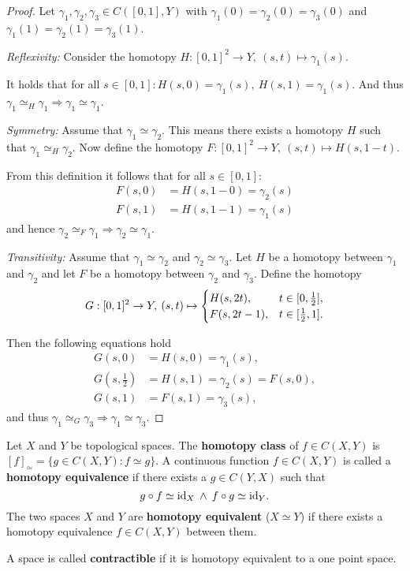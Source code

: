 \begin{proof}
  Let $\gamma_1, \gamma_2, \gamma_3 \in C([0,1],Y)$ with $\gamma_1(0) = \gamma_2(0) = \gamma_3(0)$ and $\gamma_1(1) = \gamma_2(1) = \gamma_3(1)$.
  
  \textit{Reflexivity:}
  Consider the homotopy $H\colon [0,1]^2 \to Y, \: (s, t) \mapsto \gamma_1(s)$. 
  
  It holds that for all $s\in [0,1]\colon H(s, 0) = \gamma_1(s),\: H(s, 1) = \gamma_1(s)$. And thus $\gamma_1 \simeq_H \gamma_1 \Rightarrow \gamma_1 \simeq \gamma_1$.

  \textit{Symmetry:} 
  Assume that $\gamma_1 \simeq \gamma_2$. This means there exists a homotopy $H$ such that $\gamma_1 \simeq_H \gamma_2$. 
  Now define the homotopy $F\colon [0,1]^2 \to Y, \: (s, t) \mapsto H(s, 1-t)$. 
  
  From this definition it follows that for all $s \in [0,1]:$
  \begin{align*}
    F(s, 0) &= H(s, 1 - 0) = \gamma_2(s) \\
    F(s, 1) &= H(s, 1 - 1) = \gamma_1(s)
  \end{align*}
  and hence $\gamma_2 \simeq_F \gamma_1 \Rightarrow \gamma_2 \simeq \gamma_1$.

  \textit{Transitivity:}
  Assume that $\gamma_1 \simeq \gamma_2$ and $\gamma_2 \simeq \gamma_3$. Let $H$ be a homotopy between $\gamma_1$ and $\gamma_2$ and let $F$ be a homotopy between $\gamma_2$ and $\gamma_3$. 
  Define the homotopy
  \begin{equation*} 
    G: [0,1]^2 \to Y, \: (s,t) \mapsto \begin{cases}
      H(s, 2t), &t \in [0, {1 \over 2}], \\
      F(s, 2t - 1), &t \in [{1 \over 2}, 1].
    \end{cases}
  \end{equation*}

  Then the following equations hold
  \begin{align*}
    G(s,0) &= H(s,0) = \gamma_1(s), \\
    G\left(s, \tfrac{1}{2}\right) &= H(s, 1) = \gamma_2(s) = F(s, 0), \\
    G(s, 1) &= F(s, 1) = \gamma_3(s),
  \end{align*}
  and thus $\gamma_1 \simeq_G \gamma_3 \Rightarrow \gamma_1 \simeq \gamma_3$.
\end{proof}

\begin{defin}
  Let $X$ and $Y$ be topological spaces. The \textbf{homotopy class} of $f \in C(X, Y)$ is $[f]_{\simeq} = \{g \in C(X, Y)\colon f \simeq g\}$. A continuous function $f \in C(X, Y)$ is called a \textbf{homotopy equivalence} if there exists a $g \in C(Y, X)$ such that
  \begin{equation*}
    g \circ f \simeq {\rm id}_X \: \land \: f \circ g \simeq {\rm id}_Y.
  \end{equation*}
  The two spaces $X$ and $Y$ are \textbf{homotopy equivalent} ($X \simeq Y$) if there exists a homotopy equivalence $f \in C(X, Y)$ between them.

  A space is called \textbf{contractible} if it is homotopy equivalent to a one point space.
\end{defin}

